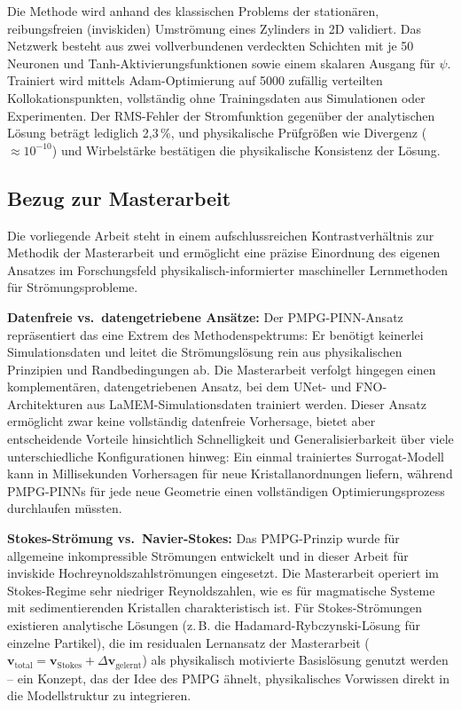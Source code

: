 \documentclass[a4paper,12pt]{article}
\begin{document}
Die Methode wird anhand des klassischen Problems der stationären, reibungsfreien (inviskiden) Umströmung eines Zylinders in 2D validiert. Das Netzwerk besteht aus zwei vollverbundenen verdeckten Schichten mit je 50 Neuronen und Tanh-Aktivierungsfunktionen sowie einem skalaren Ausgang für $\psi$. Trainiert wird mittels Adam-Optimierung auf 5000 zufällig verteilten Kollokationspunkten, vollständig ohne Trainingsdaten aus Simulationen oder Experimenten. Der RMS-Fehler der Stromfunktion gegenüber der analytischen Lösung beträgt lediglich 2{,}3\,\%, und physikalische Prüfgrößen wie Divergenz ($\approx 10^{-10}$) und Wirbelstärke bestätigen die physikalische Konsistenz der Lösung.

\subsection*{Bezug zur Masterarbeit}

Die vorliegende Arbeit steht in einem aufschlussreichen Kontrastverhältnis zur Methodik der Masterarbeit und ermöglicht eine präzise Einordnung des eigenen Ansatzes im Forschungsfeld physikalisch-informierter maschineller Lernmethoden für Strömungsprobleme.

\textbf{Datenfreie vs.\ datengetriebene Ansätze:} Der PMPG-PINN-Ansatz repräsentiert das eine Extrem des Methodenspektrums: Er benötigt keinerlei Simulationsdaten und leitet die Strömungslösung rein aus physikalischen Prinzipien und Randbedingungen ab. Die Masterarbeit verfolgt hingegen einen komplementären, datengetriebenen Ansatz, bei dem UNet- und FNO-Architekturen aus LaMEM-Simulationsdaten trainiert werden. Dieser Ansatz ermöglicht zwar keine vollständig datenfreie Vorhersage, bietet aber entscheidende Vorteile hinsichtlich Schnelligkeit und Generalisierbarkeit über viele unterschiedliche Konfigurationen hinweg: Ein einmal trainiertes Surrogat-Modell kann in Millisekunden Vorhersagen für neue Kristallanordnungen liefern, während PMPG-PINNs für jede neue Geometrie einen vollständigen Optimierungsprozess durchlaufen müssten.

\textbf{Stokes-Strömung vs.\ Navier-Stokes:} Das PMPG-Prinzip wurde für allgemeine inkompressible Strömungen entwickelt und in dieser Arbeit für inviskide Hochreynoldszahlströmungen eingesetzt. Die Masterarbeit operiert im Stokes-Regime sehr niedriger Reynoldszahlen, wie es für magmatische Systeme mit sedimentierenden Kristallen charakteristisch ist. Für Stokes-Strömungen existieren analytische Lösungen (z.\,B. die Hadamard-Rybczynski-Lösung für einzelne Partikel), die im residualen Lernansatz der Masterarbeit ($\mathbf{v}_\text{total} = \mathbf{v}_\text{Stokes} + \Delta\mathbf{v}_\text{gelernt}$) als physikalisch motivierte Basislösung genutzt werden – ein Konzept, das der Idee des PMPG ähnelt, physikalisches Vorwissen direkt in die Modellstruktur zu integrieren.
\end{document}
